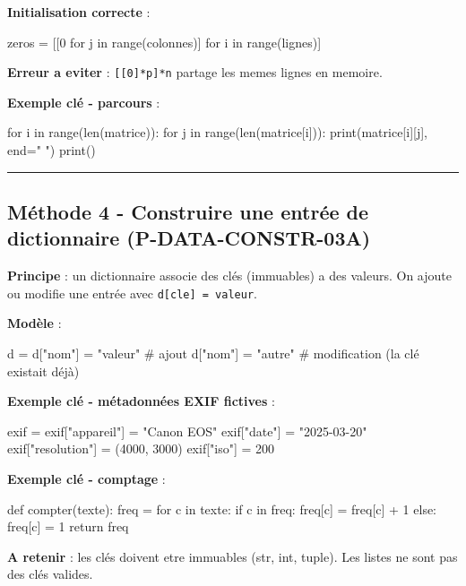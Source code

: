 \textbf{Initialisation correcte} :

\begin{python}
zeros = [[0 for j in range(colonnes)] for i in range(lignes)]
\end{python}

\textbf{Erreur a eviter} : \texttt{{[}{[}0{]}*p{]}*n} partage les memes
lignes en memoire.

\textbf{Exemple clé - parcours} :

\begin{python}
for i in range(len(matrice)):
    for j in range(len(matrice[i])):
        print(matrice[i][j], end=" ")
    print()
\end{python}

\begin{center}\rule{0.5\linewidth}{0.5pt}\end{center}

\subsection{Méthode 4 - Construire une entrée de dictionnaire (P-DATA-CONSTR-03A)}

\textbf{Principe} : un dictionnaire associe des clés (immuables) a des
valeurs. On ajoute ou modifie une entrée avec
\texttt{d{[}cle{]}\ =\ valeur}.

\textbf{Modèle} :

\begin{python}
d = {}
d["nom"] = "valeur"     # ajout
d["nom"] = "autre"      # modification (la clé existait déjà)
\end{python}

\textbf{Exemple clé - métadonnées EXIF fictives} :

\begin{python}
exif = {}
exif["appareil"] = "Canon EOS"
exif["date"] = "2025-03-20"
exif["resolution"] = (4000, 3000)
exif["iso"] = 200
\end{python}

\textbf{Exemple clé - comptage} :

\begin{python}
def compter(texte):
    freq = {}
    for c in texte:
        if c in freq:
            freq[c] = freq[c] + 1
        else:
            freq[c] = 1
    return freq
\end{python}

\textbf{A retenir} : les clés doivent etre immuables (str, int, tuple).
Les listes ne sont pas des clés valides.

